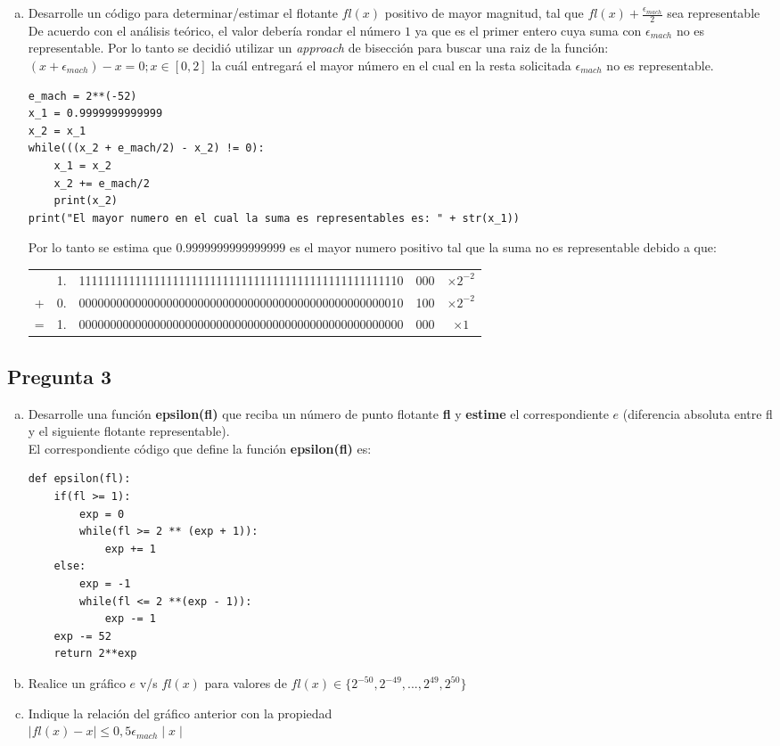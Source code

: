 \documentclass[10pt]{article}
\begin{document}
\begin{enumerate}[a)]
\item Desarrolle un código para determinar/estimar el flotante $fl(x)$ positivo de mayor magnitud, tal que $fl(x) + \frac{\epsilon_{mach}}{2}$ sea representable\\
De acuerdo con el análisis teórico, el valor debería rondar el número $1$ ya que es el primer entero cuya suma con $\epsilon_{mach}$ no es representable. Por lo tanto se decidió utilizar un \textit{approach} de bisección para buscar una raiz de la función: $(x + \epsilon_{mach}) - x = 0 ; x \in [0, 2]$ la cuál entregará el mayor número en el cual en la resta solicitada $\epsilon_{mach}$ no es representable.
\begin{verbatim}
e_mach = 2**(-52)
x_1 = 0.9999999999999
x_2 = x_1
while(((x_2 + e_mach/2) - x_2) != 0):
	x_1 = x_2
	x_2 += e_mach/2
	print(x_2)
print("El mayor numero en el cual la suma es representables es: " + str(x_1))
\end{verbatim}
Por lo tanto se estima que $0.9999999999999999$ es el mayor numero positivo tal que la suma no es representable debido a que:
\begin{center}
\begin{tabular}{c c | c | c | c}
 \cline{3-4}
 & 1. & 1111111111111111111111111111111111111111111111111110 & 000 & $\times 2^{-2}$\\
 \cline{3-4}
 + & 0. & 0000000000000000000000000000000000000000000000000010 & 100 & $\times 2^{-2}$\\
 \cline{1-5}
 = & 1. & 0000000000000000000000000000000000000000000000000000 & 000 & $\times 1$\\
 \cline{3-4}
\end{tabular}
\end{center}


\end{enumerate}

\subsection{Pregunta 3}
\begin{enumerate}[a)]
\item Desarrolle una función \textbf{epsilon(fl)} que reciba un número de punto flotante \textbf{fl} y \textbf{estime} el correspondiente $e$ (diferencia absoluta entre fl y el siguiente flotante representable).\\
El correspondiente código que define la función \textbf{epsilon(fl)} es:
\begin{verbatim}
def epsilon(fl):
	if(fl >= 1):
		exp = 0
		while(fl >= 2 ** (exp + 1)):
			exp += 1
	else:
		exp = -1
		while(fl <= 2 **(exp - 1)):
			exp -= 1
	exp -= 52
	return 2**exp
\end{verbatim}

\item Realice un gráfico $e$ v/s $fl(x)$ para valores de $fl(x) \in \{2^{-50}, 2^{-49}, ..., 2^{49}, 2^{50}\}$

\item Indique la relación del gráfico anterior con la propiedad \\
$\mid fl(x)-x \mid \leq 0,5 \epsilon_{mach} \mid x \mid$
\end{enumerate}
\end{document}
